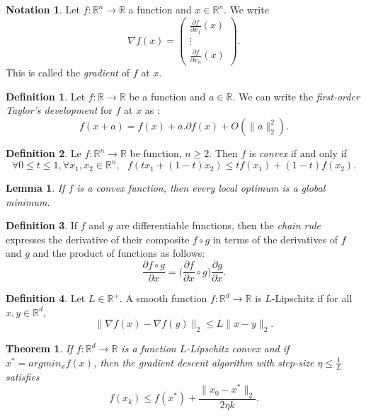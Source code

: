 \documentclass[10pt,a4paper]{article}
\theoremstyle{definition}
\newtheorem{definition}{Definition}
\newtheorem{notation}{Notation}
\theoremstyle{plain}
\newtheorem{theorem}{Theorem}
\newtheorem{prop}{Lemma}
\begin{document}
\begin{notation}
Let $f: \mathbb{R}^n \to \mathbb{R}$ a function and $x\in \mathbb{R}^n$. We write
$$
\nabla f(x) = \begin{pmatrix}
\frac{\partial f}{\partial x_1}(x) \\
\vdots \\
\frac{\partial f}{\partial x_n}(x)
\end{pmatrix}.
$$
This is called the \textit{gradient} of $f$ at $x$.
\end{notation}

\begin{definition} \label{dvltaylor}
Let $f: \mathbb{R} \rightarrow \mathbb{R}$ be a function and $a\in \mathbb{R}$.
We can write the \textit{first-order Taylor's development} for $f$ at $x$ as :
$$
f(x + a) = f(x) + a . \partial f(x) + O(\| a\|_2^2).
$$
\end{definition}

\begin{definition}
Le $f: \mathbb{R}^n \rightarrow \mathbb{R}$ be function, $n\geq 2$. Then $f$ is \textit{convex} if and only if
$$
\forall 0\leq t \leq 1, \forall x_1,x_2\in \mathbb{R}^n, \ \ \ f(tx_1 + (1-t)x_2) \leq tf(x_1) + (1-t)f(x_2).
$$
\end{definition}

\begin{prop}\label{gb}
If $f$ is a convex function, then every local optimum is a global minimum.
\end{prop}

\begin{definition}
If $f$ and $g$ are differentiable functions, then the \textit{chain rule} expresses the derivative of their composite $f \circ g$ in terms of the derivatives of $f$ and $g$ and the product of functions as follows:
$$
\frac{\partial f \circ g}{\partial x} = \Big(\frac{\partial f}{\partial x} \circ g\Big)\frac{\partial g}{\partial x}.
$$
\end{definition}

\begin{definition}
Let $L\in \mathbb{R}^+$. A smooth function $f:\mathbb{R}^d \to \mathbb{R}$ is $L$-Lipschitz if for all $x,y \in \mathbb{R}^d$,
$$
\| \nabla f(x) - \nabla f(y) \|_2 \leqslant L \|x-y\|_2.
$$
\end{definition}

\begin{theorem} \label{thmconvgd}
If $f : \mathbb{R}^d \to \mathbb{R}$ is a function $L$-Lipschitz convex and if $x^* = argmin_x f(x)$, then the gradient descent algorithm with step-size $\eta \leqslant \frac{1}{L}$ satisfies
$$
f(x_{k}) \leqslant f(x^*) + \frac{\|x_0 - x^* \|_2}{2\eta k} .
$$
\end{theorem}

\newpage

\nocite{*}


\end{document}
